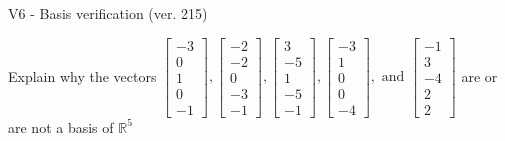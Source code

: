 \begin{exercise}
  \begin{exerciseTitle}V6 - Basis verification (ver. 215)\end{exerciseTitle}
  \begin{exerciseStatement}
    Explain why the vectors \(\left[\begin{array}{r}
-3 \\
0 \\
1 \\
0 \\
-1
\end{array}\right] , \left[\begin{array}{r}
-2 \\
-2 \\
0 \\
-3 \\
-1
\end{array}\right] , \left[\begin{array}{r}
3 \\
-5 \\
1 \\
-5 \\
-1
\end{array}\right] , \left[\begin{array}{r}
-3 \\
1 \\
0 \\
0 \\
-4
\end{array}\right] , \text{ and } \left[\begin{array}{r}
-1 \\
3 \\
-4 \\
2 \\
2
\end{array}\right]\) are or are not a basis of \(\mathbb{R}^5\)	



\end{exerciseStatement}
\end{exercise}

